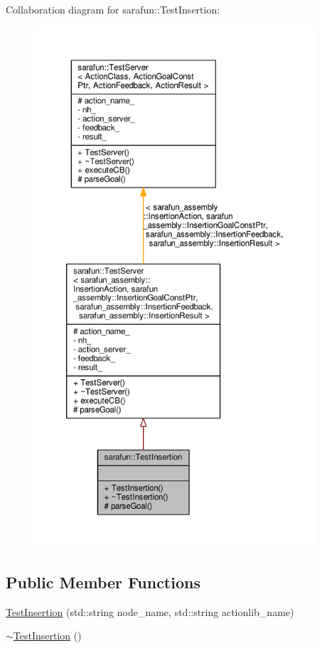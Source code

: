 Collaboration diagram for sarafun\-:\-:Test\-Insertion\-:
\nopagebreak
\begin{figure}[H]
\begin{center}
\leavevmode
\includegraphics[height=550pt]{dd/de2/classsarafun_1_1TestInsertion__coll__graph}
\end{center}
\end{figure}
\subsection*{Public Member Functions}
\begin{DoxyCompactItemize}
\item 
\hyperlink{classsarafun_1_1TestInsertion_ab178b597b83fd2f91a994f99c8b46af2_ab178b597b83fd2f91a994f99c8b46af2}{Test\-Insertion} (std\-::string node\-\_\-name, std\-::string actionlib\-\_\-name)
\item 
\hyperlink{classsarafun_1_1TestInsertion_ab732dbdbceb3872ab0c23cf92d1afc37_ab732dbdbceb3872ab0c23cf92d1afc37}{$\sim$\-Test\-Insertion} ()
\end{DoxyCompactItemize}
